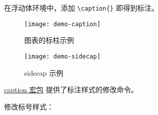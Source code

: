 在浮动体环境中，添加 \verb+\caption{}+ 即得到标注。

\begin{figure}[]
  \centering
  \texttt{[image: demo-caption]}
  \caption{图表的标柱示例}
  \label{demo-caption}
\end{figure}
\captionsetup[figure]{name=边注图}
\begin{figure}[]
  \centering
  \texttt{[image: demo-sidecap]}
  \caption{sidecap 示例}
  \label{demo-sidecap}
\end{figure}
\captionsetup[figure]{name=图}

\href{http://www.ctan.org/pkg/caption}{caption 宏包} \cite{caption} 提供了标注样式的修改命令。
\begin{texlst}[numbers=none]
\usepackage{caption}
\captionsetup[figure]{name=边注图}
\end{texlst}
修改标号样式：
\begin{texlst}[numbers=none]
\renewcommand{\thefigure}{\arabic{section}.\roman{figure}}
\end{texlst}